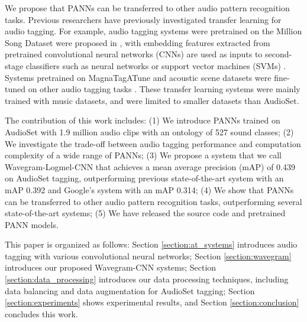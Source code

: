 \documentclass[journal]{IEEEtran}
\newcommand{\qk}[1] {{\color{black} #1}}
\begin{document}
We propose that PANNs can be transferred to other audio pattern recognition tasks. Previous researchers have previously investigated transfer learning for audio tagging. For example, audio tagging systems were pretrained on the Million Song Dataset were proposed in \cite{van2014transfer}, with embedding features extracted from pretrained convolutional neural networks (CNNs) are used as inputs to second-stage classifiers such as neural networks or support vector machines (SVMs) \cite{choi2017transfer}\cite{wang2018polyphonic}. Systems pretrained on MagnaTagATune \cite{law2009input} and acoustic scene \cite{mesaros2016tut} datasets were fine-tuned on other audio tagging tasks \cite{pons2019musicnn}\cite{diment2017transfer}. These transfer learning systems were mainly trained with music datasets, and were limited to smaller datasets than AudioSet. 

\qk{The contribution of this work includes: (1) We introduce PANNs trained on AudioSet with 1.9 million audio clips with an ontology of 527 sound classes; (2) We investigate the trade-off between audio tagging performance and computation complexity of a wide range of PANNs; (3) We propose a system that we call Wavegram-Logmel-CNN that achieves a mean average precision (mAP) of 0.439 on AudioSet tagging, outperforming previous state-of-the-art system with an mAP 0.392 and Google's system with an mAP 0.314; (4) We show that PANNs can be transferred to other audio pattern recognition tasks, outperforming several state-of-the-art systems; (5) We have released the source code and pretrained PANN models.}

This paper is organized as follows: Section \ref{section:at_systems} introduces audio tagging with various convolutional neural networks; Section \ref{section:wavegram} introduces our proposed Wavegram-CNN systems; Section \ref{section:data_processing} introduces our data processing techniques, including data balancing and data augmentation for AudioSet tagging; Section \ref{section:experiments} shows experimental results, and Section \ref{section:conclusion} concludes this work.

\IEEEpeerreviewmaketitle
\end{document}
